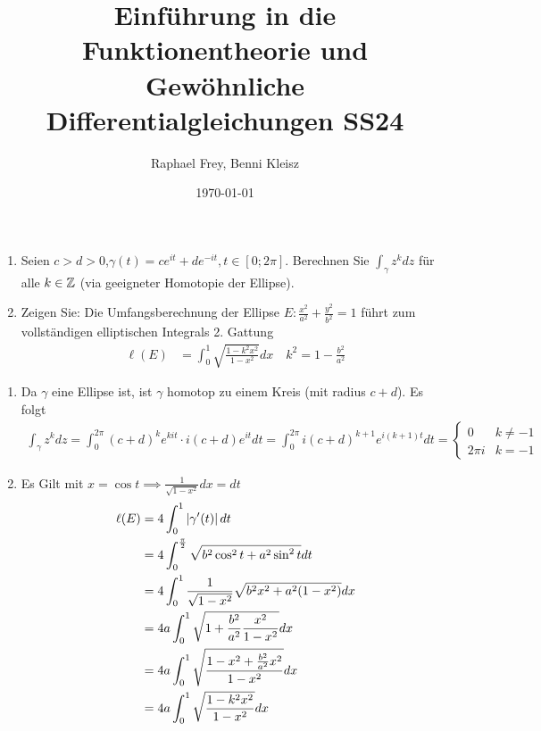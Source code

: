 \documentclass[ngerman]{report}
\title{Einführung in die Funktionentheorie und Gewöhnliche Differentialgleichungen SS24}
\author{Raphael Frey, Benni Kleisz}
\institute{Universität Tübingen}
\date{\today}
\begin{document}
\begin{question}\hspace{\linewidth}
    \begin{enumerate}
        \item Seien $c>d>0$,$\gamma(t)=ce^{it}+de^{-it},t\in[0;2\pi]$. Berechnen Sie $\int_\gamma z^k dz$ für alle $k\in\mathbb{Z}$ (via
        geeigneter Homotopie der Ellipse).
        \item Zeigen Sie: Die Umfangsberechnung der Ellipse $E : \frac{x^2}{a^2}+\frac{y^2}{b^2}=1$ führt zum vollständigen elliptischen Integrals 2. Gattung
        \begin{align*}
            \ell(E) &= \int_0^1 \sqrt{\frac{1-k^2x^2}{1-x^2}}dx \quad k^2= 1-\frac{b^2}{a^2}
        \end{align*}
    \end{enumerate}
\end{question}
\begin{answer}\hspace{\linewidth}
    \begin{enumerate}
        \item Da $\gamma$ eine Ellipse ist, ist $\gamma$ homotop zu einem Kreis (mit radius $c+d$). Es folgt 
        \begin{align*}
            \int_\gamma z^k dz = \int_0^{2\pi} (c+d)^{k} e^{kit} \cdot i(c+d)e^{it} dt = \int_0^{2\pi} i(c+d)^{k+1}e^{i(k+1)t} dt = \begin{cases}
                0 & k\neq -1\\
                2\pi i & k = -1
            \end{cases}
        \end{align*}
        \item Es Gilt mit $x = \cos  t \implies \frac{1}{  \sqrt{1-x^2}}dx = dt$
        \begin{align*}
            \ell(E) &= 4\int_0^{1} \left|\gamma'(t)\right| dt\\
            &= 4\int_0^{\frac{\pi}{2}} \sqrt{b^2\cos^2  t+a^2\sin^2 t}dt\\
            &= 4\int_0^1 \frac{1}{ \sqrt{1-x^2}}\sqrt{b^2x^2 +a^2(1-x^2)}dx\\
            &= 4a\int_0^1 \sqrt{1+\frac{b^2}{a^2}\frac{x^2}{1-x^2}}dx\\
            &= 4a\int_0^1 \sqrt{\frac{1-x^2+\frac{b^2}{a^2}x^2}{1-x^2}}dx\\
            &= 4a\int_0^1 \sqrt{\frac{1-k^2x^2}{1-x^2}}dx
        \end{align*}
    \end{enumerate}
\end{answer}
\end{document}

